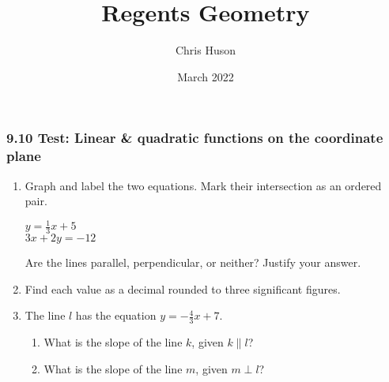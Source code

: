 \documentclass[12pt, twoside]{article}
\title{Regents Geometry}
\author{Chris Huson}
\date{March 2022}
\begin{document}
\subsubsection*{9.10 Test: Linear \& quadratic functions on the coordinate plane}
\begin{enumerate}
\item Graph and label the two equations. Mark their intersection as an ordered pair.
  \begin{multicols}{2}
    $y = \frac{1}{3}x+5$ \\
    $3x+2y = -12$
  \end{multicols}
  Are the lines parallel, perpendicular, or neither? Justify your answer.
  \vspace{1.5cm}
  \begin{center} %
  \end{center}

\item Find each value as a decimal rounded to three significant figures.
  \begin{enumerate}
  \end{enumerate}
  \vspace{0.5cm}

\newpage
\item The line $l$ has the equation $y=-\frac{4}{3} x+7$.
\begin{enumerate}
  \item What is the slope of the line $k$, given $k \parallel l$?
  \vspace{1.5cm}
  \item What is the slope of the line $m$, given $m \perp l$?
  \vspace{1.5cm}
\end{enumerate}


\end{enumerate}
\end{document}
